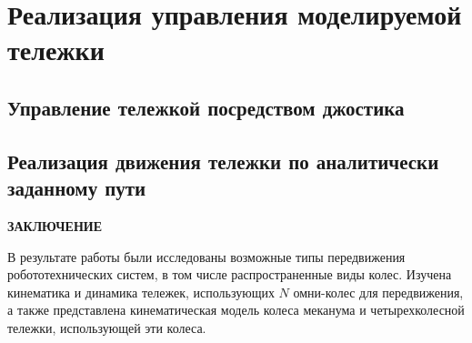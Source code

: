 \documentclass[oneside,final,14pt]{extreport}
\begin{document}
\section{Реализация управления моделируемой тележки}
\subsection{Управление тележкой посредством джостика}
\subsection{Реализация движения тележки по аналитически заданному пути}
\fi

\newpage
{}
\begin{center}
\bfseries ЗАКЛЮЧЕНИЕ
\end{center}

В результате работы были исследованы возможные типы передвижения робототехнических систем, в том числе распространенные виды колес. Изучена кинематика и динамика тележек, использующих $N$ омни-колес для передвижения, а также представлена кинематическая модель колеса меканума и четырехколесной тележки, использующей эти колеса. 
\end{document}
